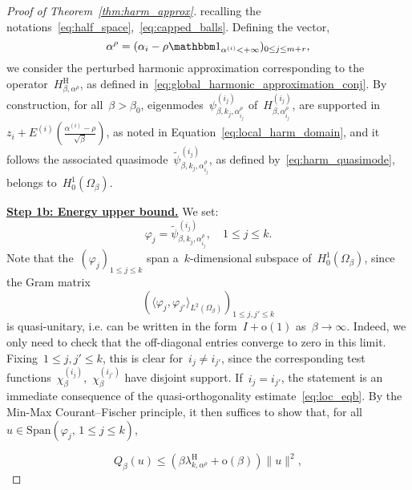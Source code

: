 \documentclass[10pt]{article}
\newcommand{\1}{\mathbbm 1}
\newcommand{\epsLimit}[1]{\alpha^{(#1)}} %
\newcommand{\halfSpace}[1]{E^{(#1)}}
\newcommand{\shift}{\rho} %
\renewcommand{\o}{\mathrm{o}}
\begin{document}
\begin{proof}[Proof of Theorem~\ref{thm:harm_approx}]
        recalling the notations~\eqref{eq:half_space},~\eqref{eq:capped_balls}.
        Defining the vector,
        \[\alpha^\shift = (\alpha_i - \shift\1_{\epsLimit{i} < +\infty})_{0\leq j\leq m+r},\]
        we consider the perturbed harmonic approximation corresponding to the operator~$H_{\beta,\alpha^\shift}^{\mathrm H}$, as defined in~\eqref{eq:global_harmonic_approximation_conj}.
        By construction, for all~$\beta>\beta_0$, eigenmodes~$\psi_{\beta,k_j,\alpha^\shift_{i_j}}^{(i_j)}$ of~$H_{\beta,\alpha^\shift_{i_j}}^{(i_j)}$, are supported in
        $z_i + \halfSpace{i}\left(\frac{\epsLimit{i}-\shift}{\sqrt\beta}\right)$, 
        as noted in Equation~\eqref{eq:local_harm_domain}, and it follows the associated quasimode~$\widetilde\psi_{\beta,k_j,\alpha^\shift_{i_j}}^{(i_j)}$, as defined by~\eqref{eq:harm_quasimode}, belongs to~$H_0^1(\Omega_\beta)$.
        
        {\underline{\bf Step 1b: Energy upper bound.}\newline}
        We set:
        \[\varphi_j = \widetilde\psi_{\beta,k_j,\alpha^\shift_{i_j}}^{(i_j)}, \quad 1\leq j\leq k.\]
        Note that the~$(\varphi_j)_{1\leq j \leq k}$ span a~$k$-dimensional subspace of~$H_0^1(\Omega_\beta)$, since the Gram matrix~$$\left(\langle \varphi_j,\varphi_{j'}\rangle_{L^2(\Omega_\beta)}\right)_{1\leq j,j'\leq k}$$ is quasi-unitary, i.e. can be written in the form~$I + \o(1)$ as~$\beta\to\infty$. Indeed, we only need to check that the off-diagonal entries converge to zero in this limit.
        Fixing~$1\leq j,j'\leq k$, this is clear for~$i_j \neq i_{j'}$, since the corresponding test functions~$\chi_\beta^{(i_j)}$,~$\chi_\beta^{(i_{j'})}$ have disjoint support. If~$i_j = i_{j'}$, the statement is an immediate consequence of the quasi-orthogonality estimate~\eqref{eq:loc_eqb}.
        By the Min-Max Courant--Fischer principle, it then suffices to show that, for all~$u\in \mathrm{Span}(\varphi_j,\,1\leq j \leq k)$,
        
        \begin{equation}
            \label{eq:thm1_ub}
            Q_\beta(u) \leq (\beta\lambda_{k,\alpha^\shift}^{\mathrm{H}}+\o(\beta))\|u\|^2,
        \end{equation}


\end{proof}
\end{document}
